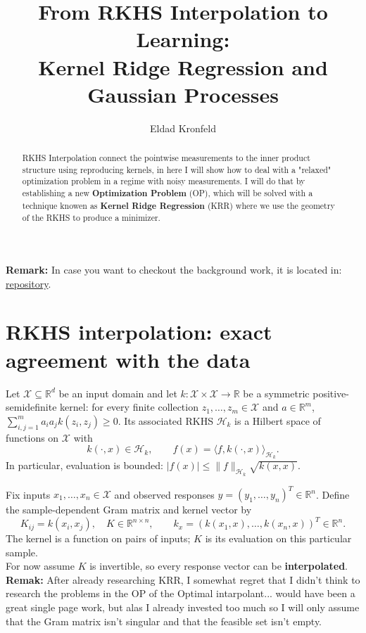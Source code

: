\documentclass[10pt,a4paper]{article}
\title{From RKHS Interpolation to Learning:\\Kernel Ridge Regression and Gaussian Processes}
\author{Eldad Kronfeld}
\date{}
\newcommand{\Hk}{\mathcal H_k}
\newcommand{\R}{\mathbb R}
\begin{document}
\maketitle
\vspace{-2em}

\begin{abstract}
	RKHS Interpolation connect the pointwise measurements to the inner product structure using reproducing kernels, in here I will show how to deal with a "relaxed" optimization problem in a regime with noisy measurements.
	I will do that by establishing a new \textbf{Optimization Problem} (OP), which will be solved with a technique knowen as \textbf{Kernel Ridge Regression} (KRR)
	where we use the geometry of the RKHS to produce a minimizer.
\end{abstract}

\textbf{Remark:} In case you want to checkout the background work, it is located in: \href{https://github.com/Eldadkro/manifold-approx-solutions}{repository}.
\section{RKHS interpolation: exact agreement with the data}
Let $\mathcal X\subseteq\R^d$ be an input domain and let $k:\mathcal X\times\mathcal X\to\R$ be a symmetric positive-semidefinite kernel: for every finite collection $z_1,\ldots,z_m\in\mathcal X$ and $a\in\R^m$,
$\sum_{i,j=1}^m a_i a_j k(z_i,z_j)\geq0$.
Its associated RKHS $\Hk$ is a Hilbert space of functions on $\mathcal X$ with
\begin{equation}
	k(\cdot,x)\in\Hk,\qquad f(x)=\langle f,k(\cdot,x)\rangle_{\Hk}.
	\label{eq:reproduction}
\end{equation}
In particular, evaluation is bounded: $|f(x)|\leq\|f\|_{\Hk}\sqrt{k(x,x)}$.

Fix inputs $x_1,\ldots,x_n\in\mathcal X$ and observed responses $y=(y_1,\ldots,y_n)^T\in\R^n$. Define the sample-dependent Gram matrix and kernel vector by
\[
	K_{ij}=k(x_i,x_j),\quad K\in\R^{n\times n},\qquad
	k_x=(k(x_1,x),\ldots,k(x_n,x))^T\in\R^n.
\]
The kernel is a function on pairs of inputs; $K$ is its evaluation on this particular sample. \\
For now assume $K$ is invertible, so every response vector can be \textbf{interpolated}.
\\
\textbf{Remak:} After already researching KRR, I somewhat regret that I didn't think to research the problems in the OP of the Optimal intarpolant...
would have been a great single page work,
but alas I already invested too much so I will
only assume that the Gram matrix isn't singular and that the feasible set isn't empty.
\end{document}
